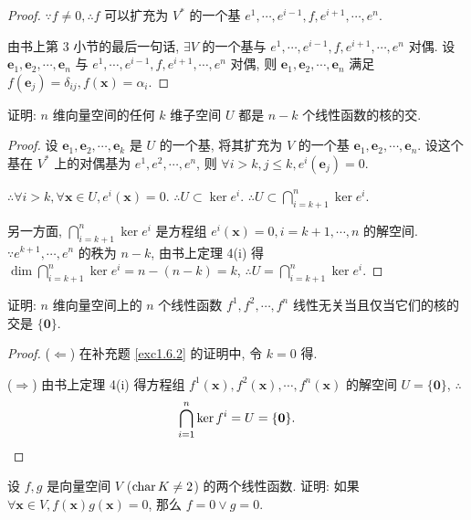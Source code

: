 \documentclass[color=black,device=normal,lang=cn,mode=geye]{elegantnote}
\begin{document}
\begin{proof}
    $\because f\neq 0,\therefore f$ 可以扩充为 $V^*$ 的一个基 $e^1,\cdots,e^{i-1},f,e^{i+1},\cdots,e^n$.
    
    由书上第 3 小节的最后一句话, $\exists V$ 的一个基与 $e^1,\cdots,e^{i-1},f,e^{i+1},\cdots,e^n$ 对偶. 设 $\boldsymbol{e}_1,\boldsymbol{e}_2,\cdots,\boldsymbol{e}_n$ 与 $e^1,\cdots,e^{i-1},f,e^{i+1},\cdots,e^n$ 对偶, 则 $\boldsymbol{e}_1,\boldsymbol{e}_2,\cdots,\boldsymbol{e}_n$ 满足 $f(\boldsymbol{e}_j)=\delta_{ij},f(\boldsymbol{x})=\alpha_i$.
\end{proof}
\begin{exercisec}[1.6.2]\label{exc1.6.2}
    证明: $n$ 维向量空间的任何 $k$ 维子空间 $U$ 都是 $n-k$ 个线性函数的核的交.
\end{exercisec}
\begin{proof}
    设 $\boldsymbol{e}_1,\boldsymbol{e}_2,\cdots,\boldsymbol{e}_k$ 是 $U$ 的一个基, 将其扩充为 $V$ 的一个基 $\boldsymbol{e}_1,\boldsymbol{e}_2,\cdots,\boldsymbol{e}_n$. 设这个基在 $V^*$ 上的对偶基为 $e^1,e^2,\cdots,e^n$, 则 $\forall i>k,j\leq k,e^i(\boldsymbol{e}_j)=0$. 

    $\therefore\forall i>k,\forall\boldsymbol{x}\in U,e^i(\boldsymbol{x})=0$. $\therefore U\subset\ker e^i$. $\therefore U\subset\bigcap\limits_{i=k+1}^n\ker e^i$.

    另一方面, $\bigcap\limits_{i=k+1}^n\ker e^i$ 是方程组 $e^i(\boldsymbol{x})=0,i=k+1,\cdots,n$ 的解空间. $\because e^{k+1},\cdots,e^n$ 的秩为 $n-k$, 由书上定理 4(i) 得 $\dim\bigcap\limits_{i=k+1}^n\ker e^i=n-(n-k)=k$, $\therefore U=\bigcap\limits_{i=k+1}^n\ker e^i$.
\end{proof}
\begin{exercisec}[1.6.3]
    证明: $n$ 维向量空间上的 $n$ 个线性函数 $f^1,f^2,\cdots,f^n$ 线性无关当且仅当它们的核的交是 $\{\boldsymbol{0}\}$.
\end{exercisec}
\begin{proof}
    ($\Leftarrow$) 在补充题 \ref{exc1.6.2} 的证明中, 令 $k=0$ 得.

    ($\Rightarrow$) 由书上定理 4(i) 得方程组 $f^1(\boldsymbol{x}),f^2(\boldsymbol{x}),\cdots,f^n(\boldsymbol{x})$ 的解空间 $U=\{\boldsymbol{0}\}$, $\therefore$
    \[\bigcap\limits_{i=1}^n\ker f^i=U=\{\boldsymbol{0}\}.\qedhere\]
\end{proof}
\begin{exercisec}[1.6.4]
    设 $f,g$ 是向量空间 $V$ ($\operatorname{char} K\neq 2$) 的两个线性函数. 证明: 如果 $\forall\boldsymbol{x}\in V,f(\boldsymbol{x})g(\boldsymbol{x})=0$, 那么 $f=0\vee g=0$.
\end{exercisec}
\end{document}

